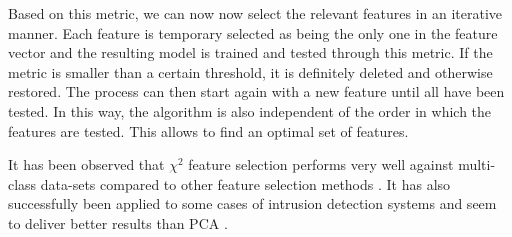 Based on this metric, we can now now select the relevant features in an iterative manner. Each feature is temporary selected as being the only one in the feature vector and the resulting model is trained and tested through this metric. If the metric is smaller than a certain threshold, it is definitely deleted and otherwise restored. The process can then start again with a new feature until all have been tested. In this way, the algorithm is also independent of the order in which the features are tested. This allows to find an optimal set of features.

It has been observed that $\chi^2$ feature selection performs very well against multi-class data-sets compared to other feature selection methods \cite{Yang:1997:CSF:645526.657137}. It has also successfully been applied to some cases of intrusion detection systems and seem to deliver better results than PCA \cite{SumaiyaThaseen2017IntrusionSVM}.